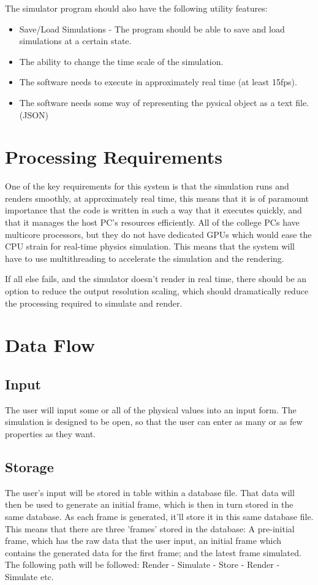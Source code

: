 The simulator program should also have the following utility features:
\begin{itemize}
	\item Save/Load Simulations - The program should be able to save and load simulations at a certain state.
	\item The ability to change the time scale of the simulation.
	\item The software needs to execute in approximately real time (at least 15fps).
	\item The software needs some way of representing the pysical object as a text file. (JSON)

\end{itemize}

\section{Processing Requirements}
One of the key requirements for this system is that the simulation runs and renders smoothly, at approximately real time, this means that it is of paramount importance that the code is written in such a way that it executes quickly, and that it manages the host PC's resources efficiently. All of the college PCs have multicore processors, but they do not have dedicated GPUs which would ease the CPU strain for real-time physics simulation. This means that the system will have to use multithreading to accelerate the simulation and the rendering.

If all else fails, and the simulator doesn't render in real time, there should be an option to reduce the output resolution scaling, which should dramatically reduce the processing required to simulate and render.

\section{Data Flow}
\subsection{Input}
	The user will input some or all of the physical values into an input form. The simulation is designed to be open, so that the user can enter as many or as few properties as they want.
\subsection{Storage}
	The user's input will be stored in table within a database file. That data will then be used to generate an initial frame, which is then in turn stored in the same database. As each frame is generated, it'll store it in this same database file. This means that there are three 'frames' stored in the database: A pre-initial frame, which has the raw data that the user input, an initial frame which contains the generated data for the first frame; and the latest frame simulated. The following path will be followed: Render - Simulate - Store - Render - Simulate etc.

